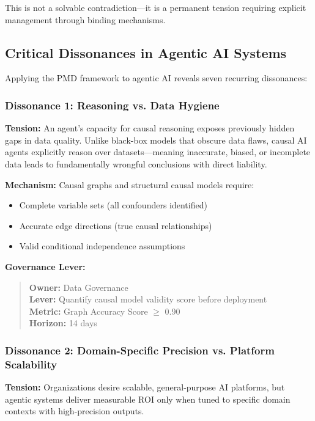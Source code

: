 \documentclass[11pt,a4paper]{article}
\begin{document}
This is not a solvable contradiction—it is a permanent tension requiring explicit management through binding mechanisms.

\subsection{Critical Dissonances in Agentic AI Systems}

Applying the PMD framework to agentic AI reveals seven recurring dissonances:

\subsubsection{Dissonance 1: Reasoning vs. Data Hygiene}

\textbf{Tension:} An agent's capacity for causal reasoning exposes previously hidden gaps in data quality. Unlike black-box models that obscure data flaws, causal AI agents explicitly reason over datasets—meaning inaccurate, biased, or incomplete data leads to fundamentally wrongful conclusions with direct liability.

\textbf{Mechanism:} Causal graphs and structural causal models require:
\begin{itemize}
\item Complete variable sets (all confounders identified)
\item Accurate edge directions (true causal relationships)
\item Valid conditional independence assumptions
\end{itemize}

\textbf{Governance Lever:}
\begin{quote}
\textbf{Owner:} Data Governance \\
\textbf{Lever:} Quantify causal model validity score before deployment \\
\textbf{Metric:} Graph Accuracy Score $\geq$ 0.90 \\
\textbf{Horizon:} 14 days
\end{quote}

\subsubsection{Dissonance 2: Domain-Specific Precision vs. Platform Scalability}

\textbf{Tension:} Organizations desire scalable, general-purpose AI platforms, but agentic systems deliver measurable ROI only when tuned to specific domain contexts with high-precision outputs.
\end{document}
